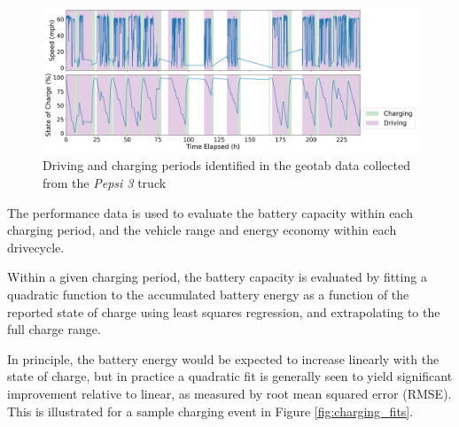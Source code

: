 \begin{figure}[ht]
        \centering
        \includegraphics[width=\textwidth]{figures/pepsi_3_speed_vs_time.png}
        \caption{Driving and charging periods identified in the geotab data collected from the \textit{Pepsi 3} truck}
        \label{fig:pepsi_3_drivecycles}
\end{figure}


The performance data is used to evaluate the battery capacity within each charging period, and the vehicle range and energy economy within each drivecycle.

Within a given charging period, the battery capacity is evaluated by fitting a quadratic function to the accumulated battery energy as a function of the reported state of charge using least squares regression, and extrapolating to the full charge range.

In principle, the battery energy would be expected to increase linearly with the state of charge, but in practice a quadratic fit is generally seen to yield significant improvement relative to linear, as measured by root mean squared error (RMSE). This is illustrated for a sample charging event in Figure \ref{fig:charging_fits}.

